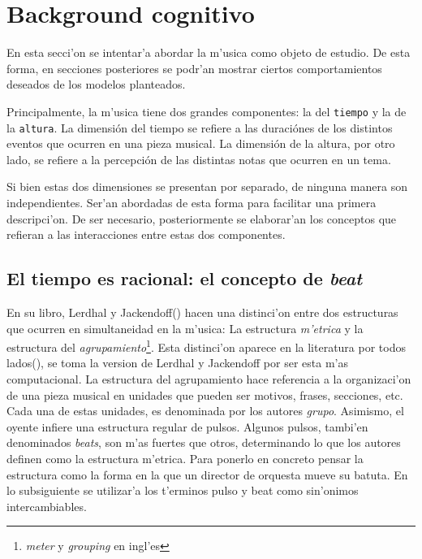 \section{Background cognitivo}
En esta secci'on se intentar'a abordar la m'usica como objeto de estudio. De esta forma, en secciones posteriores
se podr'an mostrar ciertos comportamientos deseados de los modelos planteados.

Principalmente, la m'usica tiene dos grandes componentes: la del \texttt{tiempo} y la de la 
\texttt{altura}. La dimensi\'on del tiempo se refiere a las duraci\'ones de los distintos eventos que 
ocurren en una pieza musical. La dimensi\'on de la altura, por otro lado, se refiere a la percepci\'on de las distintas notas que ocurren 
en un tema. 

Si bien estas dos dimensiones se presentan por separado, de ninguna manera son independientes. Ser'an abordadas de esta forma 
para facilitar una primera descripci'on. De ser necesario, posteriormente se elaborar'an los conceptos que refieran a las interacciones entre 
estas dos componentes. 

\subsection{El tiempo es racional: el concepto de \emph{beat}}

En su libro, Lerdhal y Jackendoff(\cita) hacen una distinci'on entre dos estructuras que ocurren en simultaneidad en la m'usica:
La estructura \emph{m'etrica} y la estructura del \emph{agrupamiento}\footnote{\emph{meter} y \emph{grouping} en ingl'es}. 
Esta distinci'on aparece en la literatura por todos lados(), se toma la version de Lerdhal y Jackendoff por ser esta m'as computacional.
La estructura del agrupamiento hace referencia a la organizaci'on de una pieza musical en unidades que pueden ser motivos, frases, secciones, etc. 
Cada una de estas unidades, es denominada por los autores \emph{grupo}. Asimismo, el oyente infiere una estructura regular de pulsos. 
Algunos pulsos, tambi'en denominados \emph{beats}, son m'as fuertes que otros, determinando lo que los autores definen como la estructura
m'etrica. Para ponerlo en concreto pensar la estructura como la forma en la que un director de orquesta mueve su batuta. En lo subsiguiente se utilizar'a
los t'erminos pulso y beat como sin'onimos intercambiables.

